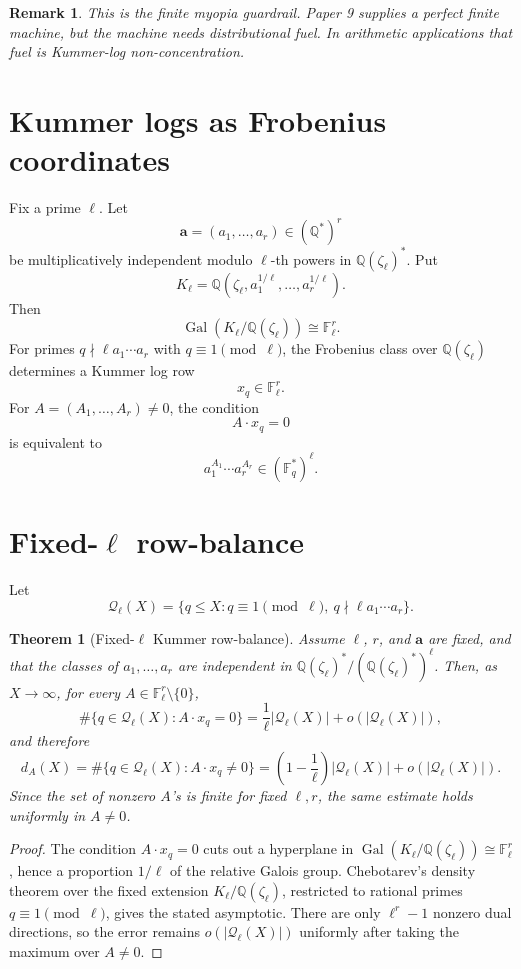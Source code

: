 \documentclass[11pt]{article}
\newtheorem{theorem}{Theorem}
\newtheorem{remark}{Remark}
\newcommand{\Q}{\mathbb Q}
\newcommand{\F}{\mathbb F}
\newcommand{\Gal}{\operatorname{Gal}}
\begin{document}
\begin{remark}
This is the finite myopia guardrail.  Paper 9 supplies a perfect finite machine, but the machine needs distributional fuel.  In arithmetic applications that fuel is Kummer-log non-concentration.
\end{remark}

\section{Kummer logs as Frobenius coordinates}

Fix a prime \(\ell\).  Let
\[
\mathbf a=(a_1,\ldots,a_r)\in(\Q^*)^r
\]
be multiplicatively independent modulo \(\ell\)-th powers in \(\Q(\zeta_\ell)^*\).  Put
\[
K_\ell=\Q(\zeta_\ell,a_1^{1/\ell},\ldots,a_r^{1/\ell}).
\]
Then
\[
\Gal(K_\ell/\Q(\zeta_\ell))\cong\F_\ell^r.
\]
For primes \(q\nmid \ell a_1\cdots a_r\) with \(q\equiv1\pmod\ell\), the Frobenius class over \(\Q(\zeta_\ell)\) determines a Kummer log row
\[
x_q\in\F_\ell^r.
\]
For \(A=(A_1,\ldots,A_r)\ne0\), the condition
\[
A\cdot x_q=0
\]
is equivalent to
\[
a_1^{A_1}\cdots a_r^{A_r}\in(\F_q^*)^\ell.
\]

\section{Fixed-\texorpdfstring{\(\ell\)}{ell} row-balance}

Let
\[
\mathcal Q_\ell(X)=\{q\le X:q\equiv1\pmod\ell,\ q\nmid \ell a_1\cdots a_r\}.
\]

\begin{theorem}[Fixed-\(\ell\) Kummer row-balance]\label{T:fixed-ell-row-balance}
Assume \(\ell\), \(r\), and \(\mathbf a\) are fixed, and that the classes of \(a_1,\ldots,a_r\) are independent in \(\Q(\zeta_\ell)^*/(\Q(\zeta_\ell)^*)^\ell\).  Then, as \(X\to\infty\), for every \(A\in\F_\ell^r\setminus\{0\}\),
\[
\#\{q\in\mathcal Q_\ell(X):A\cdot x_q=0\}
=
\frac1\ell|\mathcal Q_\ell(X)|+o(|\mathcal Q_\ell(X)|),
\]
and therefore
\[
d_A(X)=
\#\{q\in\mathcal Q_\ell(X):A\cdot x_q\ne0\}
=
\left(1-\frac1\ell\right)|\mathcal Q_\ell(X)|+o(|\mathcal Q_\ell(X)|).
\]
Since the set of nonzero \(A\)'s is finite for fixed \(\ell,r\), the same estimate holds uniformly in \(A\ne0\).
\end{theorem}

\begin{proof}
The condition \(A\cdot x_q=0\) cuts out a hyperplane in
\(\Gal(K_\ell/\Q(\zeta_\ell))\cong\F_\ell^r\), hence a proportion \(1/\ell\) of the relative Galois group.  Chebotarev's density theorem over the fixed extension \(K_\ell/\Q(\zeta_\ell)\), restricted to rational primes \(q\equiv1\pmod\ell\), gives the stated asymptotic.  There are only \(\ell^r-1\) nonzero dual directions, so the error remains \(o(|\mathcal Q_\ell(X)|)\) uniformly after taking the maximum over \(A\ne0\).
\end{proof}
\end{document}
